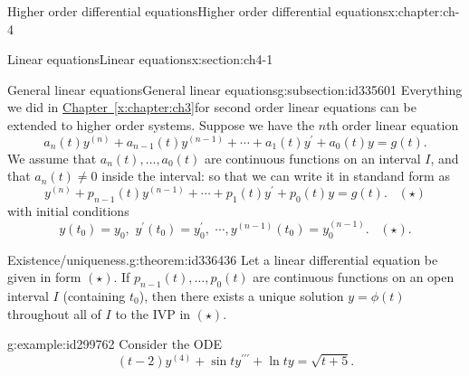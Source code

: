 \documentclass[oneside,10pt,]{book}
\newcommand{\xreffont}{\relax}
\numberwithin{equation}{section}
\numberwithin{equation}{section}
\begin{document}
\typeout{************************************************}
%
\begin{chapterptx}{Higher order differential equations}{}{Higher order differential equations}{}{}{x:chapter:ch-4}
%
%
\typeout{************************************************}
\typeout{************************************************}
%
\begin{sectionptx}{Linear equations}{}{Linear equations}{}{}{x:section:ch4-1}
%
%
\typeout{************************************************}
\typeout{************************************************}
%
\begin{subsectionptx}{General linear equations}{}{General linear equations}{}{}{g:subsection:id335601}
Everything we did in \hyperref[x:chapter:ch3]{Chapter~{\xreffont\ref{x:chapter:ch3}}}for second order linear equations can be extended to higher order systems. Suppose we have the \(n\)th order linear equation%
\begin{equation*}
a_{n}(t)y^{(n)}+a_{n-1}(t)y^{(n-1)}+\cdots+a_{1}(t)y^{\prime}+a_{0}(t)y=g(t).
\end{equation*}
We assume that \(a_{n}(t),\dots,a_{0}(t)\) are continuous functions on an interval \(I\), and that \(a_{n}(t)\neq0\) inside the interval: so that we can write it in standand form as%
\begin{equation*}
y^{(n)}+p_{n-1}(t)y^{(n-1)}+\cdots+p_{1}(t)y^{\prime}+p_{0}(t)y=g(t).\,\,\,\,\,(\star)
\end{equation*}
with initial conditions%
\begin{equation*}
y(t_{0})=y_{0},\,\,y^{\prime}(t_{0})=y_{0}^{\prime},\,\,\cdots,y^{(n-1)}(t_{0})=y_{0}^{(n-1)}.\,\,\,\,\,(\star)\text{.}
\end{equation*}
%
\begin{theorem}{Existence\slash{}uniqueness.}{}{g:theorem:id336436}%
Let a linear differential equation be given in form \((\star)\). If \(p_{n-1}(t),\dots,p_{0}(t)\) are continuous functions on an open interval \(I\) (containing \(t_{0}\)), then there exists a unique solution \(y=\phi(t)\) throughout all of \(I\) to the IVP in \((\star)\).%
\end{theorem}
\begin{example}{}{g:example:id299762}%
Consider the ODE%
\begin{equation*}
(t-2)y^{(4)}+\sin ty^{\prime\prime\prime}+\ln ty=\sqrt{t+5}.
\end{equation*}

\end{example}
\end{subsectionptx}
\end{sectionptx}
\end{chapterptx}
\end{document}
